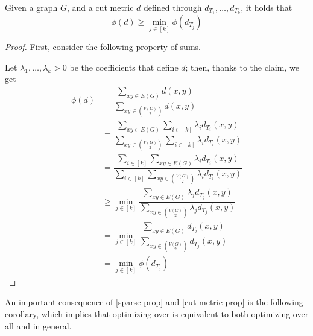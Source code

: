 \documentclass[a4paper, 12pt]{report}
\begin{document}
    \begin{framedprop}[label={cut metric prop}]{}
        Given a graph $G$, and a cut metric $d$ defined through $d_{T_1}, \ldots, d_{T_k}$, it holds that $$\phi(d) \ge \min_{j \in [k]}{\phi(d_{T_j})}$$
    \end{framedprop}

    \begin{proof}
        First, consider the following property of sums.


        Let $\lambda_1, \ldots, \lambda_k > 0$ be the coefficients that define $d$; then, thanks to the claim, we get
        \begin{equation*}
            \begin{split}
                \phi(d) &= \dfrac{\sum_{xy \in E(G)}{d(x, y)}}{\sum_{xy \in \binom{V(G)}{2}}{d(x, y)}} \\
                        &= \dfrac{\sum_{xy \in E(G)}{\sum_{i \in [k]}{\lambda_i d_{T_i}(x, y)}}}{\sum_{xy \in \binom{V(G)}{2}}{\sum_{i \in [k]}{\lambda_i d_{T_i}(x, y)}}} \\
                        &= \dfrac{\sum_{i \in [k]}{\sum_{xy \in E(G)}{\lambda_i d_{T_i}(x, y)}}}{\sum_{i \in [k]}{\sum_{xy \in \binom{V(G)}{2}}{\lambda_i d_{T_i}(x, y)}}} \\
                        &\ge \min_{j \in [k]}{\dfrac{\sum_{xy \in E(G)}{\lambda_j d_{T_j}(x,y)}}{\sum_{xy \in \binom{V(G)}{2}}{\lambda_j d_{T_j}(x, y)}}} \\
                        &= \min_{j \in [k]}{\dfrac{\sum_{xy \in E(G)}{d_{T_j}(x, y)}}{\sum_{xy \in \binom{V(G)}{2}}{d_{T_j}(x,y)}}} \\
                        &= \min_{j \in [k]}{\phi(d_{T_j})}
            \end{split}
        \end{equation*}
    \end{proof}

    An important consequence of \cref{sparse prop} and \cref{cut metric prop} is the following corollary, which implies that optimizing over  is equivalent to both optimizing over all  and  in general.
\end{document}
